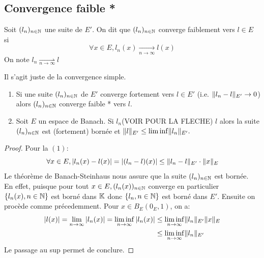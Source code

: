 \documentclass[]{report}
\begin{document}
    \subsection*{Convergence faible *}

    \begin{df}{}{}
        Soit $(l_n)_{n\in\mathbb{N}}$ une suite de $E'$. On dit que $(l_n)_{n\in\mathbb{N}}$ converge faiblement vers $l\in E$ si
        \[\forall x\in E, l_n(x)\underset{n\to \infty}{\longrightarrow} l(x)\]
        On note $l_n \underset{n\to \infty}{\rightharpoonup} l$
    \end{df}

    \begin{re}{}{}
        Il s'agit juste de la convergence simple.
    \end{re}

    \begin{prop}{}{}
        \begin{enumerate}
            \item Si une suite $(l_n)_{n\in\mathbb{N}}$ de $E'$ converge fortement vers $l\in E'$ (i.e. $\lVert l_n-l \rVert_{E'}\to 0$) alors $(l_n)_{n\in\mathbb{N}}$ converge faible * vers $l$.
            \item Soit $E$ un espace de Banach. Si $l_n$(VOIR POUR LA FLECHE) $l$ alors la suite $(l_n)_{n\in\mathbb{N}}$ est (fortement) bornée et $\lVert l \rVert_{E'}\le \liminf \lVert l_n \rVert_{E'}.$        
        \end{enumerate}
    \end{prop}

    \begin{proof}
        Pour la $(1)$:
        \[\forall x\in E,\left|l_n(x)-l(x)\right|=\left|(l_n-l)(x)\right|\le \lVert l_n-l \rVert_{E'}\cdot \lVert x \rVert_E\]
        Le théorème de Banach-Steinhaus nous assure que la suite $(l_n)_{n\in\mathbb{N}}$ est bornée.\\
        En effet, puisque pour tout $x\in E, (l_n(x))_{n\in\mathbb{N}}$ converge en particulier $\{l_n(x),n\in \mathbb{N}\}$ est borné dans $\mathbb{K}$ donc $\{l_n,n\in\mathbb{N}\}$ est borné dans $E'$. Ensuite on procède comme précedemment. Pour $x\in B_E(0_E,1)$, on a:
        \begin{align*}
            \left|l(x)\right|=\lim_{n\to \infty}\left|l_n(x)\right|=\liminf_{n\to \infty} \left|l_n(x)\right|&\le \liminf_{n\to \infty}\lVert l_n \rVert_{E'}\lVert x \rVert_E\\
            &\le \liminf_{n\to \infty} \lVert l_n \rVert_{E'}
        \end{align*}
        Le passage au sup permet de conclure.
    \end{proof}
\end{document}
